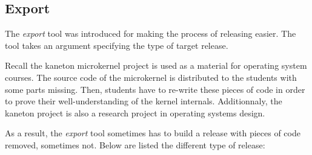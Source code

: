 %
%
%
%
%
%

%
%

\subsection{Export}
\label{section:export}

The \textit{export} tool was introduced for making the process of releasing
easier. The tool takes an argument specifying the type of target release.

Recall the kaneton microkernel project is used as a material for operating
system courses. The source code of the microkernel is distributed to
the students with some parts missing. Then, students have to re-write
these pieces of code in order to prove their well-understanding of the
kernel internals. Additionnaly, the kaneton project is also a research project
in operating systems design.

As a result, the \textit{export} tool sometimes has to build a release
with pieces of code removed, sometimes not. Below are listed the different
type of release:

